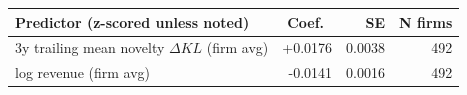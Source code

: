 \begin{tabular}{lrrr}
\toprule
Predictor (z-scored unless noted) & Coef.\ & SE & N firms \\
\midrule
3y trailing mean novelty $\Delta KL$ (firm avg) & +0.0176 & 0.0038 & 492 \\
log revenue (firm avg) & -0.0141 & 0.0016 & 492 \\
\bottomrule
\end{tabular}
